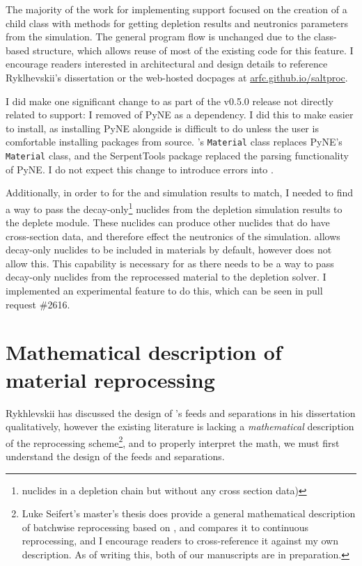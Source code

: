 The majority of the work for implementing \OpenMC support focused on the
creation of a child class with methods for getting depletion results and
neutronics parameters from the \OpenMC simulation. The general program
flow is unchanged due to the class-based structure, which allows reuse of most
of the existing code for this feature. I encourage readers interested in
architectural and design details to reference Ryklhevskii's dissertation
\cite{rykhlevskii_fuel_2020} or the web-hosted \SaltProc docpages at
\url{arfc.github.io/saltproc}.

I did make one significant change to \SaltProc as part of the v0.5.0 release
not directly related to \OpenMC support: I removed of PyNE as a dependency.
I did this to make \SaltProc easier to install, as installing PyNE alongside
\OpenMC is difficult to do unless the user is comfortable installing packages
from source. \OpenMC's \verb.Material. class replaces PyNE's \verb.Material.
class, and the SerpentTools package replaced the \SerpentTWO parsing
functionality of PyNE. I do not expect this change to introduce errors into
\SaltProc.

Additionally, in order to for the \OpenMC and \SerpentTWO simulation results
to match, I needed to find a way to pass the decay-only\footnote{nuclides in a
depletion chain but without any cross section data)} nuclides from the 
depletion simulation results to the \OpenMC deplete module. These nuclides
can produce other nuclides that do have cross-section data, and therefore effect
the neutronics of the simulation. \SerpentTWO allows
decay-only nuclides to be included in materials by default, however \OpenMC does
not allow this. This capability is necessary for \SaltProc as there needs to be a way
to pass decay-only nuclides from the reprocessed material to the depletion solver.
I implemented an experimental feature to do this, which can be seen in \OpenMC pull request
\#2616.


\section{Mathematical description of material reprocessing}
Rykhlevskii has discussed the design of \SaltProc's feeds and separations in
his dissertation \cite{rykhlevskii_fuel_2020} qualitatively, however the existing \SaltProc literature is lacking a {\it mathematical} description of the reprocessing scheme\footnote{Luke Seifert's master's thesis does provide a general
mathematical description of batchwise reprocessing based on \SaltProc, and
compares it to continuous reprocessing, and I encourage readers to
cross-reference it against my own description. As of writing this, both of
our manuscripts are in preparation.}, and to properly interpret the math, we
must first understand the design of the feeds and separations.


